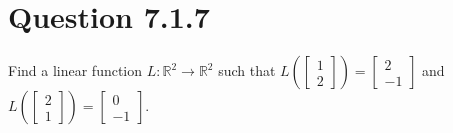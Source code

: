 \documentclass[12pt]{article}
\begin{document}
\section*{Question 7.1.7}
Find a linear function \( L: \mathbb{R}^2 \to \mathbb{R}^2 \) such that \( L\left(\begin{bmatrix} 1 \\ 2 \end{bmatrix}\right) = \begin{bmatrix} 2 \\ -1 \end{bmatrix} \) and \( L\left(\begin{bmatrix} 2 \\ 1 \end{bmatrix}\right) = \begin{bmatrix} 0 \\ -1 \end{bmatrix} \).
\end{document}
